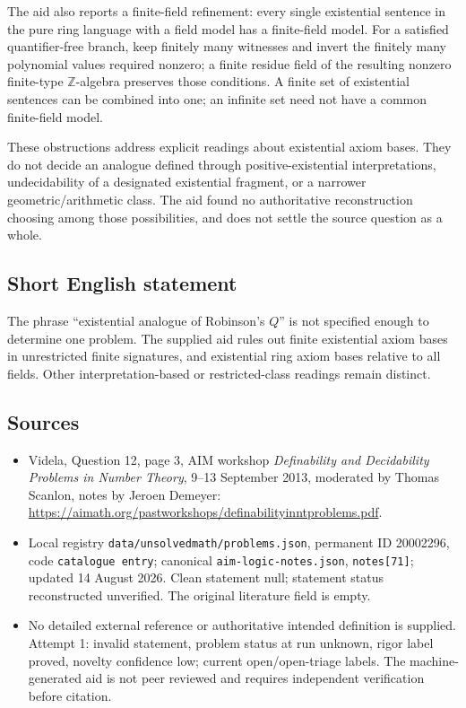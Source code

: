 \documentclass[11pt]{article}
\newcommand{\Z}{\mathbb{Z}}
\begin{document}
The aid also reports a finite-field refinement: every single existential sentence in the pure ring language with a field model has a finite-field model. For a satisfied quantifier-free branch, keep finitely many witnesses and invert the finitely many polynomial values required nonzero; a finite residue field of the resulting nonzero finite-type \(\Z\)-algebra preserves those conditions. A finite set of existential sentences can be combined into one; an infinite set need not have a common finite-field model.

These obstructions address explicit readings about existential axiom bases. They do not decide an analogue defined through positive-existential interpretations, undecidability of a designated existential fragment, or a narrower geometric/arithmetic class. The aid found no authoritative reconstruction choosing among those possibilities, and does not settle the source question as a whole.
\subsection{Short English statement}
The phrase “existential analogue of Robinson's \(Q\)” is not specified enough to determine one problem. The supplied aid rules out finite existential axiom bases in unrestricted finite signatures, and existential ring axiom bases relative to all fields. Other interpretation-based or restricted-class readings remain distinct.
\subsection{Sources}
\begin{itemize}
\item Videla, Question 12, page 3, AIM workshop \emph{Definability and Decidability Problems in Number Theory}, 9--13 September 2013, moderated by Thomas Scanlon, notes by Jeroen Demeyer: \url{https://aimath.org/pastworkshops/definabilityinntproblems.pdf}.
\item Local registry \texttt{data/unsolvedmath/problems.json}, permanent ID 20002296, code \texttt{catalogue entry}; canonical \texttt{aim-logic-notes.json}, \texttt{notes[71]}; updated 14 August 2026. Clean statement null; statement status reconstructed unverified. The original literature field is empty.
\item No detailed external reference or authoritative intended definition is supplied. Attempt 1: invalid statement, problem status at run unknown, rigor label proved, novelty confidence low; current open/open-triage labels. The machine-generated aid is not peer reviewed and requires independent verification before citation.
\end{itemize}
\end{document}
